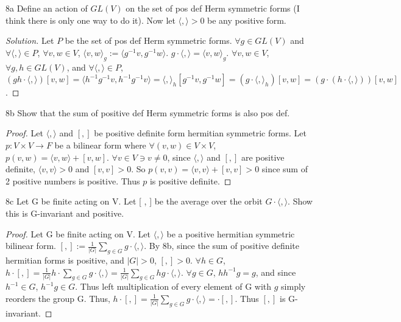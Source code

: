 \documentclass{article}
\newcommand{\angles}[1]{{\langle #1 \rangle}}
\newenvironment{solution}
{\renewcommand\qedsymbol{$\blacksquare$}\begin{proof}[Solution]}
{\end{proof}}
\begin{document}
\begin{PROB}{8a}\label{Problem 8a.}
    Define an action of $GL(V)$ on the set of pos def Herm symmetric forms  (I think there is only one way to do it).  Now let $\angles{ , } > 0$ be any positive form.   
\end{PROB}
\begin{solution}
    Let $P$ be the set of pos def Herm symmetric forms.
    $\forall g \in GL(V)$ and $\forall \angles{ , } \in P$, $\forall v, w \in V$, $\angles{v, w}_g := \angles{g^{-1}v , g^{-1}w}$. $g \cdot \angles{,} = \angles{v, w}_g$. $\forall v,w \in V$, $\forall g, h \in GL(V)$, and $\forall \angles{ , } \in P$, $(gh \cdot \angles{,})[v,w] = \angles{h^{-1}g^{-1}v, h^{-1}g^{-1}v} = \angles{,}_h[g^{-1}v, g^{-1}w] = (g \cdot \angles{,}_h)[v,w]= (g \cdot (h \cdot \angles{,}))[v, w]$.      
\end{solution}
\begin{claim}{8b}\label{Claim 8b.}
    Show that the sum of positive def Herm symmetric forms is also pos def.
\end{claim}
\begin{proof}
    Let $\angles{, }$ and $[ , ]$ be positive definite form hermitian symmetric forms. Let $p: V \times V \to F$ be a bilinear form where $\forall (v, w) \in V \times V$, $p(v, w) = \angles{v, w} + [v, w]$. $\forall v \in V \ni v \neq 0$, since $\angles{,}$ and $[,]$ are positive definite, $\angles{v,v} > 0$ and $[v,v] > 0$. So $p(v,v) = \angles{v, v} + [v, v] > 0$ since sum of 2 positive numbers is positive. Thus $p$ is positive definite.                
\end{proof}
\begin{PROB}{8c}\label{Problem 8c.}
    Let G be finite acting on V. Let [ , ] be the average over the orbit $G\cdot\angles{ , }$. Show this is G-invariant and positive.
\end{PROB}
\begin{proof}
    Let G be finite acting on V. Let $\angles{ , }$ be a positive hermitian symmetric bilinear form. $[,] := \frac{1}{|G|} \sum_{g \in G} g \cdot \angles{,}$. By 8b, since the sum of positive definite hermitian forms is positive, and $|G| > 0$, $[,] > 0$. $\forall h \in G$, $h \cdot [ , ]  = \frac{1}{|G|} h \cdot \sum_{g \in G} g \cdot \angles{,} = \frac{1}{|G|} \sum_{g \in G} hg \cdot \angles{,}$. $\forall g \in G$, $h h^{-1} g = g$, and since $h^{-1} \in G$, $h^{-1}g \in G$. Thus left multiplication of every element of G with $g$ simply reorders the group G. Thus, $h\cdot[,] = \frac{1}{|G|} \sum_{g \in G} g \cdot \angles{,} = \cdot[,]$. Thus $[,]$ is G-invariant.               
\end{proof}
\end{document}
